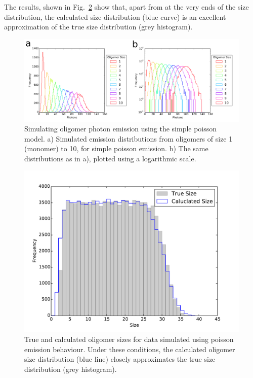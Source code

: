 The results, shown in Fig.~\ref{fig:poisson_size_photons_uniform} show that, apart from at the very ends of the size distribution, the calculated size distribution (blue curve) is an excellent approximation of the true size distribution (grey histogram).        

\begin{figure}
   \begin{center}
      \includegraphics*[clip=true, width=6in]{sizing/poisson_size_photons.pdf}
      \caption{Simulating oligomer photon emission using the simple poisson model. a) Simulated emission distributions from oligomers of size 1 (monomer) to 10, for simple poisson emission. b) The same distributions as in a), plotted using a logarithmic scale.}
      \label{fig:poisson_size_photons}
   \end{center}
\end{figure}


\begin{figure}
   \begin{center}
      \includegraphics*[clip=true, width=6in]{sizing/True_vs_Measured_oligomer_events_uniform_poisson_100000_hist.pdf}
      \caption{True and calculated oligomer sizes for data simulated using poisson emission behaviour. Under these conditions, the calculated oligomer size distribution (blue line) closely approximates the true size distribution (grey histogram).}
      \label{fig:poisson_size_photons_uniform}
   \end{center}
\end{figure}

